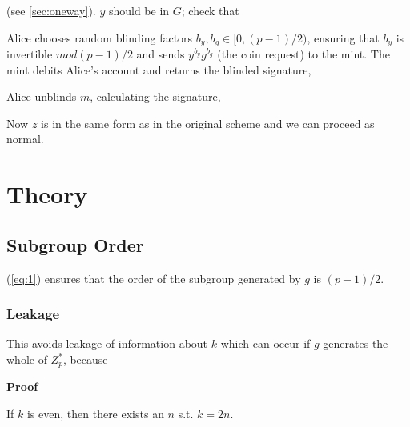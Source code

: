 \documentclass[a4paper,titlepage]{article}
\begin{document}

(see \ref{sec:oneway}). $y$ should be in $G$; check that


Alice chooses random blinding factors $b_y,b_g \in [0,(p-1)/2)$,
ensuring that $b_y$ is invertible $mod (p-1)/2$ and
sends $y^{b_y} g^{b_g}$ (the coin request) to the mint. The mint
debits Alice's account and returns the blinded signature,


Alice unblinds $m$, calculating the signature,


Now $z$ is in the same form as in the original scheme and we can
proceed as normal.

\section{Theory}

\subsection{Subgroup Order}
\label{sec:theory1}

(\ref{eq:1}) ensures that the order of the subgroup generated by $g$ is
$(p-1)/2$.

\subsubsection{Leakage}

This avoids leakage of information about $k$ which can
occur if $g$ generates the whole of $Z_p^*$, because


{\bf Proof}

If $k$ is even, then there exists an $n$
s.t. $k=2n$.
\end{document}
